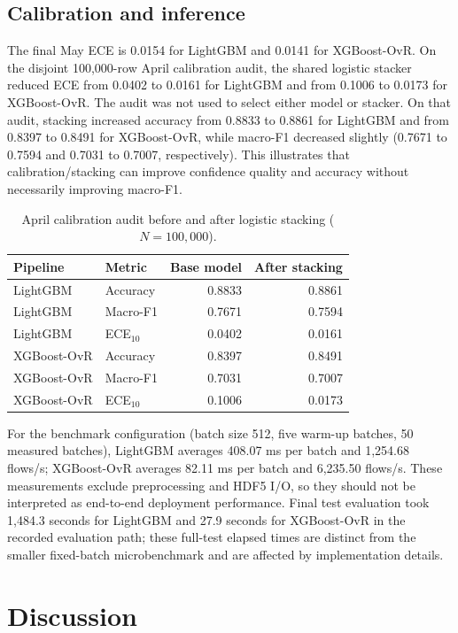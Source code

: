 \documentclass[conference]{IEEEtran}
\begin{document}
\subsection{Calibration and inference}

The final May ECE is 0.0154 for LightGBM and 0.0141 for XGBoost-OvR. On the disjoint 100,000-row April calibration audit, the shared logistic stacker reduced ECE from 0.0402 to 0.0161 for LightGBM and from 0.1006 to 0.0173 for XGBoost-OvR. The audit was not used to select either model or stacker. On that audit, stacking increased accuracy from 0.8833 to 0.8861 for LightGBM and from 0.8397 to 0.8491 for XGBoost-OvR, while macro-F1 decreased slightly (0.7671 to 0.7594 and 0.7031 to 0.7007, respectively). This illustrates that calibration/stacking can improve confidence quality and accuracy without necessarily improving macro-F1.

\begin{table}[t]
\centering
\caption{April calibration audit before and after logistic stacking ($N=100{,}000$).}
\label{tab:calibration_audit}
\small
\begin{tabular}{llrr}
\toprule
Pipeline & Metric & Base model & After stacking \\
\midrule
LightGBM & Accuracy & 0.8833 & 0.8861 \\
LightGBM & Macro-F1 & 0.7671 & 0.7594 \\
LightGBM & ECE$_{10}$ & 0.0402 & 0.0161 \\
XGBoost-OvR & Accuracy & 0.8397 & 0.8491 \\
XGBoost-OvR & Macro-F1 & 0.7031 & 0.7007 \\
XGBoost-OvR & ECE$_{10}$ & 0.1006 & 0.0173 \\
\bottomrule
\end{tabular}
\end{table}

For the benchmark configuration (batch size 512, five warm-up batches, 50 measured batches), LightGBM averages 408.07 ms per batch and 1,254.68 flows/s; XGBoost-OvR averages 82.11 ms per batch and 6,235.50 flows/s. These measurements exclude preprocessing and HDF5 I/O, so they should not be interpreted as end-to-end deployment performance. Final test evaluation took 1,484.3 seconds for LightGBM and 27.9 seconds for XGBoost-OvR in the recorded evaluation path; these full-test elapsed times are distinct from the smaller fixed-batch microbenchmark and are affected by implementation details.

\section{Discussion}
\label{sec:discussion}
\end{document}
